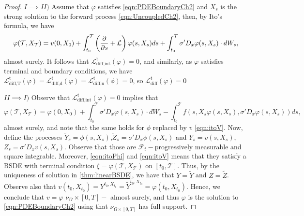 \begin{proof}
	
	$I \implies II)$ Assume that $\varphi$ satisfies \eqref{eqn:PDEBoundaryCh2} and $X_s$ is the strong solution to the forward process \eqref{eqn:UncoupledCh2}, then, by Ito's formula, we have
\begin{equation}
	\varphi(\mathcal{T},X_\mathcal{T})=v(0,X_0)+\int_{t_0}^{\mathcal{T}}\left(\frac{\partial }{\partial s}+\mathcal{L}\right)\varphi(s,X_s)ds+\int_{t_0}^{\mathcal{T}}\sigma'D_x \varphi(s,X_s)\cdot dW_s,
\end{equation}
almost surely. It follows that $\mathcal{L}_{\text{diff,int}}^{\mathrm{t}}(\varphi)=0$, and similarly, as $\varphi$ satisfies terminal and boundary conditions, we have $\mathcal{L}_{\text{diff,T}}^{\mathrm{t}}(\varphi)=\mathcal{L}_{\text{diff,d}}^{\mathrm{t}}(\varphi)=\mathcal{L}_{\text{diff,n}}^{\mathrm{t}}(\phi)=0$, so $\mathcal{L}_{\text{diff}}^{\mathrm{t}}(\varphi)=0$

$II \implies I)$ Observe that $\mathcal{L}_{\text{diff,int}}^{\mathrm{t}}(\varphi)=0$ implies that 
\begin{equation}
	\label{eqn:itoPhi}
	\varphi(\mathcal{T},X_\mathcal{T})=\varphi(0,X_0)+\int_{t_0}^{\mathcal{T}}\sigma'D_x\varphi(s,X_s)\cdot dW_s-\int_{t_0}^{\mathcal{T}}f(s,X_s \varphi(s,X_s),\sigma' D_x \varphi(s,X_s))ds,
\end{equation}
almost surely, and note that the same holds for $\phi$ replaced by $v$ \eqref{eqn:itoV}. Now, define the processes $\tilde{Y}_s=\phi(s,X_s)$,$\tilde{Z}_s=\sigma'D_x \phi(s,X_s)$ and $Y_s=v(s,X_s)$,$Z_s=\sigma'D_x v(s,X_s)$. Observe that those are $\mathcal{F}_{t}-$progressively measurable and square integrable. Moreover, \eqref{eqn:itoPhi} and \eqref{eqn:itoV} means that they satisfy a BSDE with terminal condition $\xi=\varphi(\mathcal{T},X_\mathcal{T})$ on $[t_0,\mathcal{T}]$. Thus, by the uniqueness of solution in \autoref{thm:linearBSDE}, we have that $Y=\tilde{Y}$ and $Z=\tilde{Z}$. Observe also that $v(t_{0},X_{t_0})=Y^{t_0,X_{t_0}}=\tilde{Y}^{t_0,X_{t_0}}=\varphi(t_0,X_{t_0})$. Hence, we conclude that $v=\varphi$ $\nu_{\Omega}\times [0,T]-$ almost surely, and thus $\varphi$ is the solution to \eqref{eqn:PDEBoundaryCh2} using that $\nu_{\Omega\times[0,T]}$ has full support.
\end{proof}

